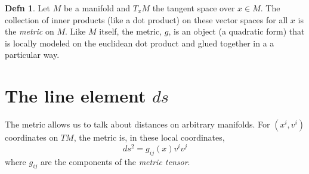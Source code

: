 \documentclass{article}
\theoremstyle{definition}
\newtheorem*{definition}{Defn}
\theoremstyle{remark}
\theoremstyle{remark}
\begin{document}
\begin{definition}
  Let $M$ be a manifold and $T_xM$ the tangent space over $x\in M$. The collection of inner products (like a dot product) on these vector spaces for all $x$ is the \emph{metric} on $M$. Like $M$ itself, the metric, $g$, is an object (a quadratic form) that is locally modeled on the euclidean dot product and glued together in a a particular way. 
\end{definition}
\section{The line element $ds$}

The metric allows us to talk about distances on arbitrary manifolds. For $(x^i, v^i)$ coordinates on $TM$, the metric is, in these local coordinates,
$$
ds^2 = g_{ij}(x)v^iv^j
$$
where $g_{ij}$ are the components of the \emph{metric tensor}. 
\end{document}
